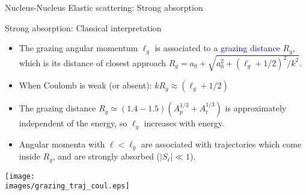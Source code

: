 \documentclass[english,10pt]{beamer}
\newcommand{\bi}{\begin{itemize}}
\newcommand{\ei}{\end{itemize}}
\newcommand{\images}{images}
\begin{document}
\begin{frame}[fragile]{Nucleus-Nucleus Elastic scattering: Strong absorption}







\end{frame}

\begin{frame}[fragile]{Strong absorption: Classical interpretation}

{\small

\bi

\item The grazing angular momentum $\ell_g$ is associated to a \textcolor{blue}{grazing distance} $R_g$, which is  its distance of closest approach $R_g = a_0 + \sqrt{a_0^2 + (\ell_g+1/2)^2/k^2}$.

\item When Coulomb is weak (or absent):   $k R_g \approx (\ell_g+1/2)$

\item The grazing distance $R_g \simeq (1.4-1.5) (A_p^{1/3} + A_t^{1/3})$  is approximately independent of the energy, so $\ell_g$ increases with energy.

\item Angular momenta with $\ell < \ell_g$ are associated with trajectories which come inside $R_g$, and are strongly absorbed ($|S_\ell| \ll 1$).

\ei
}
\begin{center}
    \texttt{[image: \\images/grazing\_traj\_coul.eps]}
\end{center}

\end{frame}
\end{document}
